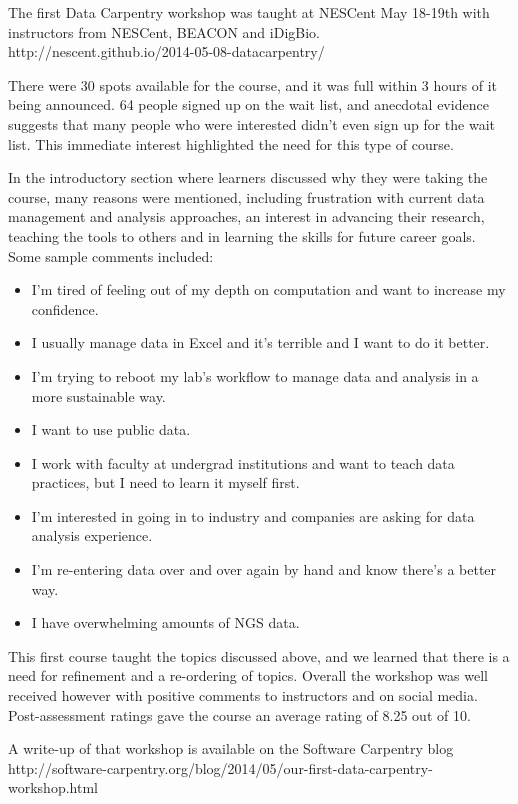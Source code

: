 \documentclass[11pt]{article}
\begin{document}
The first Data Carpentry workshop was taught at NESCent May 18-19th with instructors from NESCent, BEACON and 
iDigBio.
\\http://nescent.github.io/2014-05-08-datacarpentry/

There were 30 spots available for the course, and it was full within 3 hours of it being announced. 64 people signed up on the wait list, and anecdotal evidence suggests that many people who were interested didn't even sign up for the wait list. This immediate interest highlighted the need for this type of course.

In the introductory section where learners discussed why they were taking the course, many reasons were mentioned, including frustration with current data management and analysis approaches, an interest in advancing their research, teaching the tools to others and in learning the skills for future career goals. Some sample comments included:

\begin{itemize}
\item I'm tired of feeling out of my depth on computation and want to increase my confidence.
\item I usually manage data in Excel and it's terrible and I want to do it better.
\item I'm trying to reboot my lab's workflow to manage data and analysis in a more sustainable way.
\item I want to use public data.
\item I work with faculty at undergrad institutions and want to teach data practices, but I need to learn it myself first.
\item I'm interested in going in to industry and companies are asking for data analysis experience.
\item I'm re-entering data over and over again by hand and know there's a better way.
\item I have overwhelming amounts of NGS data.
\end{itemize}

This first course taught the topics discussed above, and we learned that there is a need for refinement and a 
re-ordering of topics. Overall the workshop was well received however with positive comments to instructors and on social 
media. Post-assessment ratings gave the course an average rating of 8.25 out of 10.

A write-up of that workshop is available on the Software Carpentry blog
\\http://software-carpentry.org/blog/2014/05/our-first-data-carpentry-workshop.html
\end{document}
